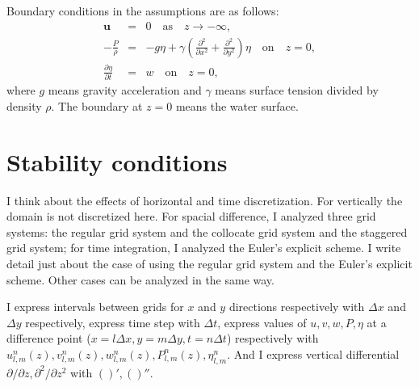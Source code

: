 \documentclass[a4paper,11pt]{article}
\newcommand{\as}{\quad\mathrm{as}\quad}
\newcommand{\on}{\quad\mathrm{on}\quad}
\begin{document}
Boundary conditions in the assumptions are as follows:
\begin{eqnarray}
 \bm{u} &=& 0 \as z \to -\infty, \\
- \frac{P}{\rho}
&=& - g\eta + \gamma \left(
  \frac{\partial^2}{\partial x^2} + \frac{\partial^2}{\partial y^2}
  \right) \eta \on z=0, \\
 \frac{\partial \eta}{\partial t}
&=& w \on z=0,
\end{eqnarray}
where $g$ means gravity acceleration and $\gamma$ means surface tension divided by density $\rho$. The boundary at $z=0$ means the water surface.

\section{Stability conditions}

I think about the effects of horizontal and time discretization. For vertically the domain is not discretized here.
For spacial difference, I analyzed three grid systems: the regular grid system and the collocate grid system and the staggered grid system;
for time integration, I analyzed the Euler's explicit scheme. I write detail just about the case of using the regular grid system and the Euler's explicit scheme. Other cases can be analyzed in the same way.

I express intervals between grids for $x$ and $y$ directions
respectively with $\Delta x$ and $\Delta y$ respectively,
express time step with $\Delta t$,
express values of $u, v, w, P, \eta$ at a difference point
($x = l \Delta x, y = m \Delta y, t = n \Delta t$) respectively with
$u^n_{l,m}(z), v^n_{l,m}(z), w^n_{l,m}(z), P^n_{l,m}(z), \eta^n_{l,m}$.
And I express vertical differential $\partial/\partial z,
\partial^2/\partial z^2$ with $()', ()''$.
\end{document}

